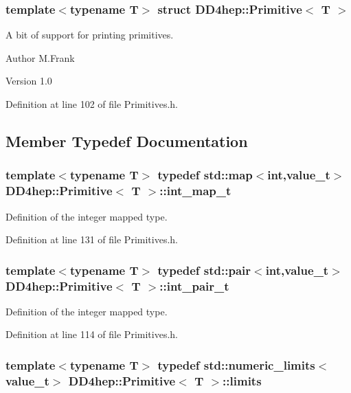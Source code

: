 \subsubsection*{template$<$typename T$>$ struct DD4hep::Primitive$<$ T $>$}

A bit of support for printing primitives. \begin{DoxyAuthor}{Author}
M.Frank 
\end{DoxyAuthor}
\begin{DoxyVersion}{Version}
1.0 
\end{DoxyVersion}


Definition at line 102 of file Primitives.h.

\subsection{Member Typedef Documentation}
\hypertarget{struct_d_d4hep_1_1_primitive_acfd7524785eae3d3470f44b23ce0424f}{
\subsubsection[{int\_\-map\_\-t}]{\setlength{\rightskip}{0pt plus 5cm}template$<$typename T$>$ typedef std::map$<$int,{\bf value\_\-t}$>$ {\bf DD4hep::Primitive}$<$ {\bf T} $>$::{\bf int\_\-map\_\-t}}}
\label{struct_d_d4hep_1_1_primitive_acfd7524785eae3d3470f44b23ce0424f}


Definition of the integer mapped type. 

Definition at line 131 of file Primitives.h.\hypertarget{struct_d_d4hep_1_1_primitive_a216f9ee1122ffc970b0d419abe76009c}{
\subsubsection[{int\_\-pair\_\-t}]{\setlength{\rightskip}{0pt plus 5cm}template$<$typename T$>$ typedef std::pair$<$int,{\bf value\_\-t}$>$ {\bf DD4hep::Primitive}$<$ {\bf T} $>$::{\bf int\_\-pair\_\-t}}}
\label{struct_d_d4hep_1_1_primitive_a216f9ee1122ffc970b0d419abe76009c}


Definition of the integer mapped type. 

Definition at line 114 of file Primitives.h.\hypertarget{struct_d_d4hep_1_1_primitive_a9f6d14410388a5c8067d274030dbdc3c}{
\subsubsection[{limits}]{\setlength{\rightskip}{0pt plus 5cm}template$<$typename T$>$ typedef std::numeric\_\-limits$<${\bf value\_\-t}$>$ {\bf DD4hep::Primitive}$<$ {\bf T} $>$::{\bf limits}}}
\label{struct_d_d4hep_1_1_primitive_a9f6d14410388a5c8067d274030dbdc3c}


